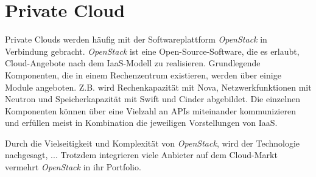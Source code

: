 \documentclass[../main.tex]{subfiles}
\begin{document}



  \section{Private Cloud}
  \label{privateCloud}
    Private Clouds werden häufig mit der Softwareplattform \emph{OpenStack} in Verbindung gebracht. \emph{OpenStack} ist eine Open-Source-Software, die es erlaubt, Cloud-Angebote nach dem IaaS-Modell zu realisieren. Grundlegende Komponenten, die in einem Rechenzentrum existieren, werden über einige Module angeboten. Z.B. wird Rechenkapazität mit Nova, Netzwerkfunktionen mit Neutron und Speicherkapazität mit Swift und Cinder abgebildet. Die einzelnen Komponenten können über eine Vielzahl an APIs miteinander kommunizieren und erfüllen meist in Kombination die jeweiligen Vorstellungen von IaaS.

    Durch die Vielseitigkeit und Komplexität von \emph{OpenStack}, wird der Technologie nachgesagt, ... %
    Trotzdem integrieren viele Anbieter auf dem Cloud-Markt vermehrt \emph{OpenStack} in ihr Portfolio.
\end{document}
